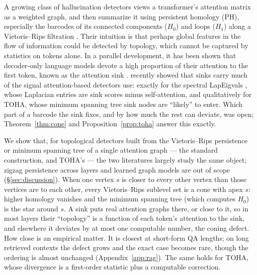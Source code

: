 \documentclass{article}
\theoremstyle{definition}
\begin{document}
A growing class of hallucination detectors views a transformer's attention matrix as a weighted graph, and then summarize it using persistent homology (PH), especially the barcodes of its connected components ($H_0$) and loops ($H_1$) along a Vietoris--Rips filtration \citep{kushnareva2021,cherniavskii2022,perez2022topological,kostenok2023,toha,samaga2026halluzig}. Their intuition is that perhaps global features in the flow of information could be detected by topology, which cannot be captured by statistics on tokens alone. In a parallel development, it has been shown that decoder-only language models devote a high proportion of their attention to the first token, known as the attention sink \citep{xiao2023efficient,sun2024massive,cancedda2024spectral,gu2025attentionsink,barbero2025first}. \citet{binkowski2026sinkprobe} recently showed that sinks carry much of the signal attention-based detectors use: exactly for the spectral LapEigvals \citep{binkowski2025lapeigvals}, whose Laplacian entries are sink scores minus self-attention, and qualitatively for TOHA, whose minimum spanning tree sink nodes are ``likely'' to enter. Which part of a barcode the sink fixes, and by how much the rest can deviate, was open; Theorem~\ref{thm:cone} and Proposition~\ref{prop:toha} answer this exactly.

We show that, for topological detectors built from the Vietoris--Rips persistence or minimum spanning tree of a single attention graph --- the standard construction, and TOHA's --- the two literatures largely study the same object; zigzag persistence across layers and learned graph models are out of scope (\S\ref{sec:discussion}). When one vertex $s$ is closer to every other vertex than those vertices are to each other, every Vietoris--Rips sublevel set is a cone with apex $s$: higher homology vanishes and the minimum spanning tree (which computes $H_0$) is the star around $s$. A sink puts real attention graphs there, or close to it, so in most layers their ``topology'' is a function of each token's attention to the sink, and elsewhere it deviates by at most one computable number, the coning defect. How close is an empirical matter. It is closest at short-form QA lengths; on long retrieved contexts the defect grows and the exact case becomes rare, though the ordering is almost unchanged (Appendix~\ref{app:rag}). The same holds for TOHA, whose divergence is a first-order statistic plus a computable correction.
\end{document}
